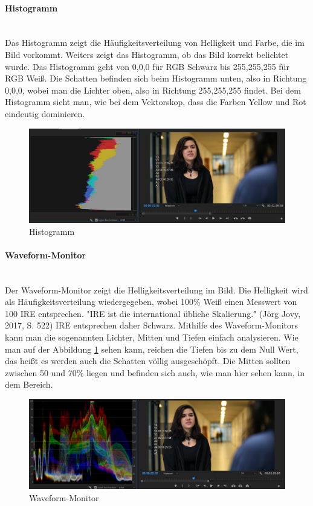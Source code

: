 \paragraph{Histogramm}
\leavevmode \\
Das Histogramm zeigt die Häufigkeitsverteilung von Helligkeit und Farbe, die im Bild vorkommt. Weiters zeigt das Histogramm, ob das Bild korrekt belichtet wurde. Das Histogramm geht von 0,0,0 für RGB Schwarz bis 255,255,255 für RGB Weiß. Die Schatten befinden sich beim Histogramm unten, also in Richtung 0,0,0, wobei man die Lichter oben, also in Richtung 255,255,255 findet.\citep{histogramm}\newline
Bei dem Histogramm sieht man, wie bei dem Vektorskop, dass die Farben Yellow und Rot eindeutig dominieren. 
\begin{figure}[H]
	\centering
	\includegraphics[width=1.0\textwidth]{abb21} 
	\caption{Histogramm}
\end{figure}
\paragraph{Waveform-Monitor}
\leavevmode \\
Der Waveform-Monitor zeigt die Helligkeitsverteilung im Bild. Die Helligkeit wird als Häufigkeitsverteilung wiedergegeben, wobei 100\% Weiß einen Messwert von 100 IRE entsprechen. "IRE ist die international übliche Skalierung." (Jörg Jovy, 2017, S. 522) IRE entsprechen daher Schwarz. Mithilfe des Waveform-Monitors kann man die sogenannten Lichter, Mitten und Tiefen einfach analysieren.\citep{waveform}\newline
Wie man auf der Abbildung \ref{fig:abb20} sehen kann, reichen die Tiefen bis zu dem Null Wert, das heißt es werden auch die Schatten völlig ausgeschöpft. Die Mitten sollten zwischen 50 und 70\% liegen und befinden sich auch, wie man hier sehen kann, in dem Bereich.\citep{waveformZwei}
\begin{figure}[H]
	\centering
	\includegraphics[width=1.0\textwidth]{abb20} 
	\caption{Waveform-Monitor}\label{fig:abb20}
\end{figure}
